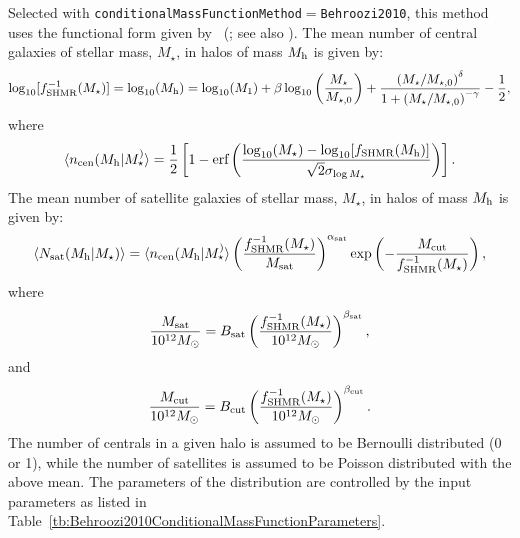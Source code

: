 Selected with {\tt conditionalMassFunctionMethod}$=${\tt Behroozi2010}, this method uses the functional form given by \citeauthor{behroozi_comprehensive_2010}~(\citeyear{behroozi_comprehensive_2010}; see also \citealt{leauthaud_new_2011}). The mean number of central galaxies of stellar mass, $M_\star$, in halos of mass $M_{\rm h}$ is given by:
\begin{equation}
 \log_{10}[f_{\rm SHMR}^{-1}(M_\star)] = \log_{10}(M_{\rm h}) = \log_{10}(M_1) + \beta \log_{10}\left({M_\star\over M_{\star,0}}\right)+{\left( M_\star / M_{\star,0}\right)^\delta \over 1 + \left(M_\star/M_{\star,0}\right)^{-\gamma}} - {1\over 2},
\end{equation}
where
\begin{equation}
 \langle n_{\rm cen} (M_{\rm h}|M_\star^)\rangle = {1\over 2}\left[1 - \hbox{erf}\left( {\log_{10}(M_\star) - \log_{10}[f_{\rm SHMR}(M_{\rm h})] \over \sqrt{2}\sigma_{\log M_\star}}\right) \right].
\end{equation}
The mean number of satellite galaxies of stellar mass, $M_\star$, in halos of mass $M_{\rm h}$ is given by:
\begin{equation}
 \langle N_{\rm sat}(M_{\rm h}|M_\star)\rangle =  \langle n_{\rm cen} (M_{\rm h}|M_\star^)\rangle \left({f_{\rm SHMR}^{-1}(M_\star) \over M_{\rm sat}}\right)^{\alpha_{\rm sat}} \exp\left( - {M_{\rm cut} \over f_{\rm SHMR}^{-1}(M_\star)}\right),
\end{equation}
where
\begin{equation}
 {M_{\rm sat} \over 10^{12}M_\odot} = B_{\rm sat} \left({f_{\rm SHMR}^{-1}(M_\star) \over 10^{12}M_\odot}\right)^{\beta_{\rm sat}},
\end{equation}
and
\begin{equation}
 {M_{\rm cut} \over 10^{12}M_\odot} = B_{\rm cut} \left({f_{\rm SHMR}^{-1}(M_\star) \over 10^{12}M_\odot}\right)^{\beta_{\rm cut}}.
\end{equation}
The number of centrals in a given halo is assumed to be Bernoulli distributed (0 or 1), while the number of satellites is assumed to be Poisson distributed with the above mean. The parameters of the distribution are controlled by the input parameters as listed in Table~\ref{tb:Behroozi2010ConditionalMassFunctionParameters}.

